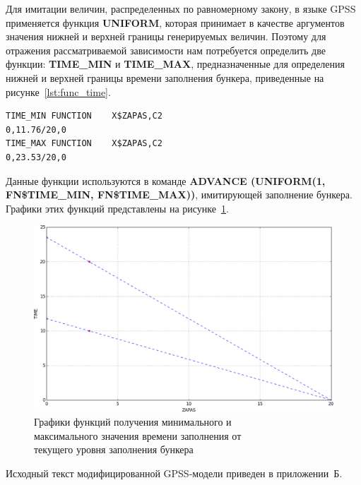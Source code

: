 Для имитации величин, распределенных по равномерному закону, в языке GPSS
применяется функция \textbf{UNIFORM}, которая принимает в качестве аргументов 
значения нижней и верхней границы генерируемых величин.
Поэтому для отражения рассматриваемой зависимости нам потребуется определить 
две функции: \textbf{TIME\_MIN} и \textbf{TIME\_MAX},
предназначенные для определения нижней и верхней границы времени заполнения
бункера, приведенные на рисунке~\ref{lst:func_time}.

\begin{lstlisting}[caption=Функции определения верхней и нижней временной границы заполнения бункера,
label=lst:func_time,numbers=none,resetmargins=true,xleftmargin=0mm,
xrightmargin=0mm]
TIME_MIN FUNCTION    X$ZAPAS,C2
0,11.76/20,0
TIME_MAX FUNCTION    X$ZAPAS,C2
0,23.53/20,0
\end{lstlisting}

Данные функции используются в команде
\textbf{ADVANCE (UNIFORM(1, FN\$TIME\_MIN, FN\$TIME\_MAX))},
имитирующей заполнение бункера. 
Графики этих функций представлены на рисунке~\ref{pic:time_func}.

\begin{figure}[h!]
  \centering
  \includegraphics[width=150mm]{pic/time_func}
  \caption{Графики функций получения минимального и \\
    максимального значения времени заполнения от \\
    текущего уровня заполнения бункера}
  \label{pic:time_func}
\end{figure}


Исходный текст модифицированной GPSS-модели приведен в приложении~Б.